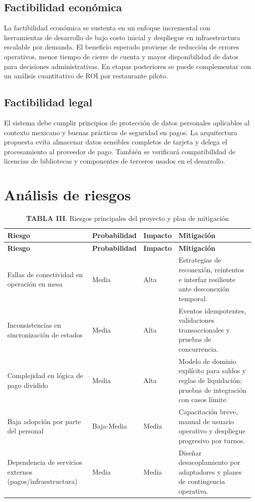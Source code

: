 \documentclass[12pt]{report}
\begin{document}
\subsection{Factibilidad económica}
La factibilidad económica se sustenta en un enfoque incremental con herramientas de desarrollo de bajo costo inicial y despliegue en infraestructura escalable por demanda. El beneficio esperado proviene de reducción de errores operativos, menor tiempo de cierre de cuenta y mayor disponibilidad de datos para decisiones administrativas. En etapas posteriores se puede complementar con un análisis cuantitativo de ROI por restaurante piloto.

\subsection{Factibilidad legal}
El sistema debe cumplir principios de protección de datos personales aplicables al contexto mexicano y buenas prácticas de seguridad en pagos. La arquitectura propuesta evita almacenar datos sensibles completos de tarjeta y delega el procesamiento al proveedor de pago. También se verificará compatibilidad de licencias de bibliotecas y componentes de terceros usados en el desarrollo.

\section{Análisis de riesgos}
\begin{table}[H]
\centering
\setlength{\aboverulesep}{0pt}
\setlength{\belowrulesep}{0pt}
\begin{tabularx}{\textwidth}{p{3.2cm}p{2cm}p{2cm}X}
\toprule
\textbf{Riesgo} & \textbf{Probabilidad} & \textbf{Impacto} & \textbf{Mitigación} \\
\midrule
\hline
\textbf{Riesgo} & \textbf{Probabilidad} & \textbf{Impacto} & \textbf{Mitigación} \\ \hline
Fallas de conectividad en operación en mesa & Media & Alta & Estrategias de reconexión, reintentos e interfaz resiliente ante desconexión temporal. \\
Inconsistencias en sincronización de estados & Media & Alta & Eventos idempotentes, validaciones transaccionales y pruebas de concurrencia. \\
Complejidad en lógica de pago dividido & Media & Alta & Modelo de dominio explícito para saldos y reglas de liquidación; pruebas de integración con casos límite. \\
Baja adopción por parte del personal & Baja-Media & Media & Capacitación breve, manual de usuario operativo y despliegue progresivo por turnos. \\
Dependencia de servicios externos (pagos/infraestructura) & Media & Media & Diseñar desacoplamiento por adaptadores y planes de contingencia operativa. \\
\bottomrule
\end{tabularx}
\caption*{\normalfont\textbf{TABLA III}. Riesgos principales del proyecto y plan de mitigación}
\label{tab:riesgos_proyecto}
\end{table}

\newpage

\end{document}
